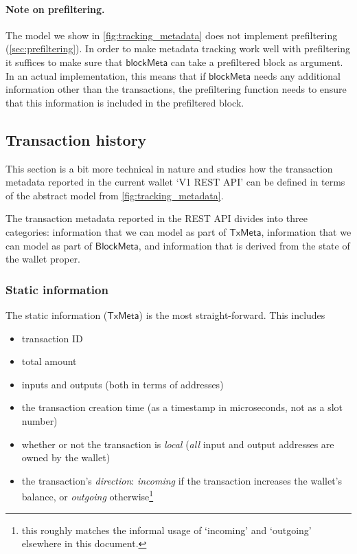 \documentclass{article}
\theoremstyle{definition}{
  \newtheorem{lemma}{Lemma}[section] %
  \newtheorem{definition}[lemma]{Definition}
}
\theoremstyle{theorem}{
  \newtheorem{invariant}[lemma]{Invariant}
  \newtheorem{proofobligation}[lemma]{Proof Obligation}
}
\numberwithin{equation}{lemma}
\begin{document}
\paragraph{Note on prefiltering.} The model we show in
\cref{fig:tracking_metadata} does not implement prefiltering
(\cref{sec:prefiltering}). In order to make metadata tracking work well
with prefiltering it suffices to make sure that $\mathsf{blockMeta}$ can take a
prefiltered block as argument. In an actual implementation, this means that if
$\mathsf{blockMeta}$ needs any additional information other than the
transactions, the prefiltering function needs to ensure that this information
is included in the prefiltered block.

\subsection{Transaction history}
\label{sec:transaction_history}

This section is a bit more technical in nature and studies how the transaction
metadata reported in the current wallet `V1 REST API' can be defined in terms
of the abstract model from \cref{fig:tracking_metadata}.

The transaction metadata reported in the REST API divides into three categories:
information that we can model as part of $\mathsf{TxMeta}$, information that
we can model as part of $\mathsf{BlockMeta}$, and information that is derived
from the state of the wallet proper.

\subsubsection{Static information}

The static information ($\mathsf{TxMeta}$) is the most straight-forward.
This includes
%
\begin{itemize}
\item transaction ID
\item total amount
\item inputs and outputs (both in terms of addresses)
\item the transaction creation time
(as a timestamp in microseconds, not as a slot number)
\item whether or not the transaction is \emph{local}
(\emph{all} input and output addresses are owned by the wallet)
\item the transaction's \emph{direction}: \emph{incoming} if the transaction
increases the wallet's balance, or \emph{outgoing} otherwise\footnote{this
roughly matches the informal usage of `incoming' and `outgoing' elsewhere in
this document.}
\end{itemize}
\end{document}
